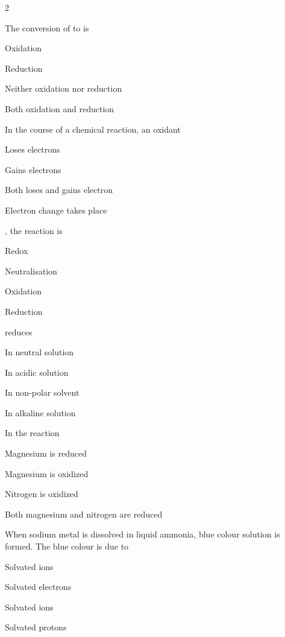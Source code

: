\documentclass[10pt,a4paper]{article}
\begin{document}
\begin{multicols}{2}
\begin{questions}[start=1]
\item The conversion of  to  is
\begin{options}
  \item Oxidation
  \item Reduction
  \item Neither oxidation nor reduction
  \item Both oxidation and reduction
\end{options}

\item In the course of a chemical reaction, an oxidant
\begin{options}
  \item Loses electrons
  \item Gains electrons
  \item Both loses and gains electron
  \item Electron change takes place
\end{options}

\item {}, the reaction is
\begin{options}
  \item Redox
  \item Neutralisation
  \item Oxidation
  \item Reduction
\end{options}

\item {} reduces 
\begin{options}
  \item In neutral solution
  \item In acidic solution
  \item In non-polar solvent
  \item In alkaline solution
\end{options}

\item In the reaction 
\begin{options}
  \item Magnesium is reduced
  \item Magnesium is oxidized
  \item Nitrogen is oxidized
  \item Both magnesium and nitrogen are reduced
\end{options}

\item When sodium metal is dissolved in liquid ammonia, blue colour solution is formed. The blue colour is due to
\begin{options}
  \item Solvated  ions
  \item Solvated electrons
  \item Solvated  ions
  \item Solvated protons
\end{options}


\end{questions}
\end{multicols}
\end{document}

